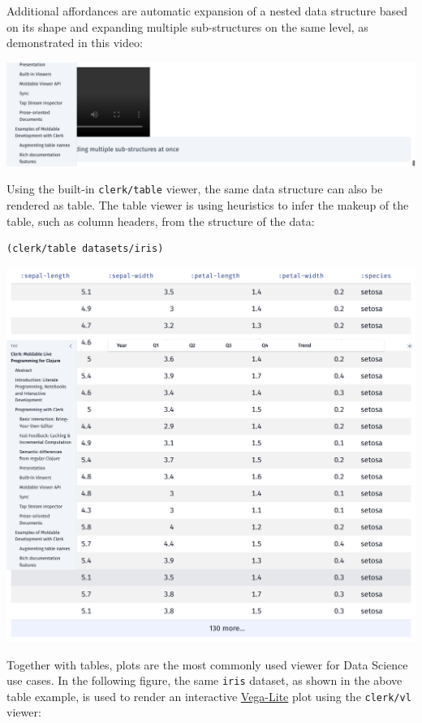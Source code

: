 \documentclass[sigconf,screen]{acmart}
\newcommand{\passthrough}[1]{#1}
\begin{document}
Additional affordances are automatic expansion of a nested data structure based on its shape and expanding multiple sub-structures on the same level, as demonstrated in this video:

\includegraphics{images/result-anon-expr-5drhGBZL7eJfRr1ugHxqr6u3fsUQuz.png}

Using the built-in \passthrough{\lstinline!clerk/table!} viewer, the same data structure can also be rendered as table. The table viewer is using heuristics to infer the makeup of the table, such as column headers, from the structure of the data:

\begin{lstlisting}
(clerk/table datasets/iris)
\end{lstlisting}

\includegraphics{images/result-anon-expr-5dtuc4aWdsThsN1ZehoANzcdjAoyh5.png}

Together with tables, plots are the most commonly used viewer for Data Science use cases. In the following figure, the same \passthrough{\lstinline!iris!} dataset, as shown in the above table example, is used to render an interactive \href{https://vega.github.io/vega-lite/}{Vega-Lite} plot using the \passthrough{\lstinline!clerk/vl!} viewer:
\end{document}
